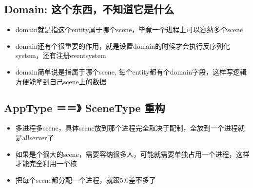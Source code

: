 \documentclass[9pt, b5paper]{article}
\begin{document}
\subsection{Domain: 这个东西，不知道它是什么}
\label{sec-11-2}
\begin{itemize}
\item domain就是指这个entity属于哪个scene，毕竟一个进程上可以容纳多个scene
\item domain还有个很重要的作用，就是设置domain的时候才会执行反序列化system，还有注册eventsystem
\item domain简单说是指属于哪个scene, 每个entity都有个domain字段，这样写逻辑方便能拿到自己scene上的数据
\end{itemize}
\subsection{AppType ＝＝》 SceneType 重构}
\label{sec-11-3}
\begin{itemize}
\item 多进程多scene，具体scene放到那个进程完全取决于配制，全放到一个进程就是allserver了
\item 如果是个很大的scene，需要容纳很多人，可能就需要单独占用一个进程，这样才能完全利用一个核
\item 把每个scene都分配一个进程，就跟5.0差不多了
\end{itemize}
\end{document}

